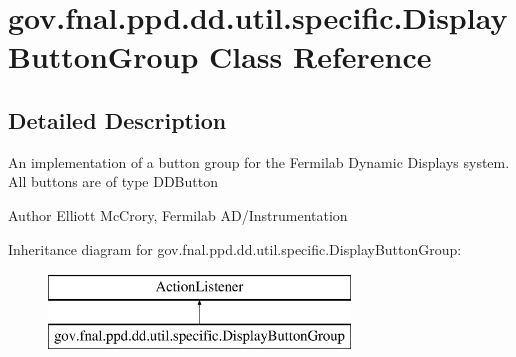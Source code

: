 \hypertarget{classgov_1_1fnal_1_1ppd_1_1dd_1_1util_1_1specific_1_1DisplayButtonGroup}{\section{gov.\-fnal.\-ppd.\-dd.\-util.\-specific.\-Display\-Button\-Group Class Reference}
\label{classgov_1_1fnal_1_1ppd_1_1dd_1_1util_1_1specific_1_1DisplayButtonGroup}
}


\subsection{Detailed Description}
An implementation of a button group for the Fermilab Dynamic Displays system. All buttons are of type D\-D\-Button

\begin{DoxyAuthor}{Author}
Elliott Mc\-Crory, Fermilab A\-D/\-Instrumentation 
\end{DoxyAuthor}
Inheritance diagram for gov.\-fnal.\-ppd.\-dd.\-util.\-specific.\-Display\-Button\-Group\-:\begin{figure}[H]
\begin{center}
\leavevmode
\includegraphics[height=2.000000cm]{classgov_1_1fnal_1_1ppd_1_1dd_1_1util_1_1specific_1_1DisplayButtonGroup}
\end{center}
\end{figure}
